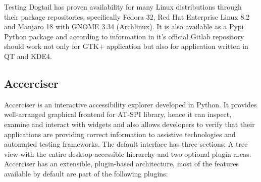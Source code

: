  Testing Dogtail has proven availability for many Linux distributions through their package repositories, specifically Fedora 32, Red Hat Enterprise Linux 8.2 and Manjaro 18 with GNOME 3.34 (Archlinux). It is also available as a Pypi Python package and according to information in it's official Gitlab repository should work not only for GTK+ application but also for application written in QT and KDE4.  

\subsection{Accerciser}
Accerciser is an interactive accessibility explorer developed in Python. It provides well-arranged graphical frontend for AT-SPI library, hence it can inspect, examine and interact with widgets and also allows developers to verify that their applications are providing correct information to assistive technologies and automated testing frameworks. The default interface has three sections: A tree view with the entire desktop accessible hierarchy and two optional plugin areas. Accerciser has an extensible, plugin-based architecture, most of the features available by default are part of the following plugins: 

